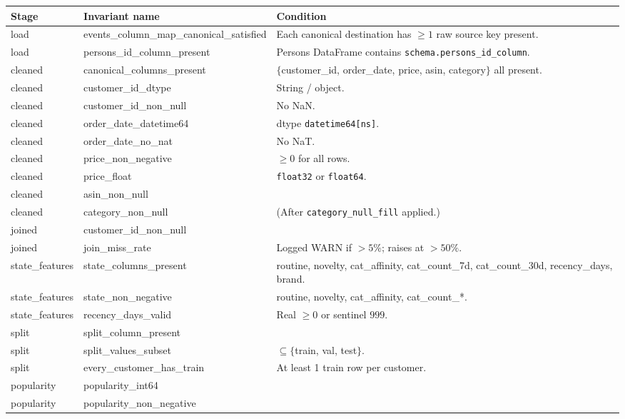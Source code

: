 \documentclass[11pt,a4paper]{article}
\begin{document}
\begin{center}
\small
\begin{tabular}{@{}l l l@{}}
\toprule
Stage & Invariant name & Condition \\
\midrule
load                 & events\_column\_map\_canonical\_satisfied & Each canonical destination has $\ge 1$ raw source key present. \\
load                 & persons\_id\_column\_present              & Persons DataFrame contains \texttt{schema.persons\_id\_column}. \\
cleaned              & canonical\_columns\_present              & $\{$customer\_id, order\_date, price, asin, category$\}$ all present. \\
cleaned              & customer\_id\_dtype                      & String / object. \\
cleaned              & customer\_id\_non\_null                   & No NaN. \\
cleaned              & order\_date\_datetime64                   & dtype \texttt{datetime64[ns]}. \\
cleaned              & order\_date\_no\_nat                      & No NaT. \\
cleaned              & price\_non\_negative                     & $\ge 0$ for all rows. \\
cleaned              & price\_float                             & \texttt{float32} or \texttt{float64}. \\
cleaned              & asin\_non\_null                          & \\
cleaned              & category\_non\_null                      & (After \texttt{category\_null\_fill} applied.) \\
joined               & customer\_id\_non\_null                   & \\
joined               & join\_miss\_rate                         & Logged WARN if $> 5\%$; raises at $> 50\%$. \\
state\_features      & state\_columns\_present                   & routine, novelty, cat\_affinity, cat\_count\_7d, cat\_count\_30d, recency\_days, brand. \\
state\_features      & state\_non\_negative                     & routine, novelty, cat\_affinity, cat\_count\_*. \\
state\_features      & recency\_days\_valid                      & Real $\ge 0$ or sentinel $999$. \\
split                & split\_column\_present                   & \\
split                & split\_values\_subset                    & $\subseteq \{$train, val, test$\}$. \\
split                & every\_customer\_has\_train               & At least 1 train row per customer. \\
popularity           & popularity\_int64                        & \\
popularity           & popularity\_non\_negative                & \\
\bottomrule
\end{tabular}
\end{center}
\end{document}
